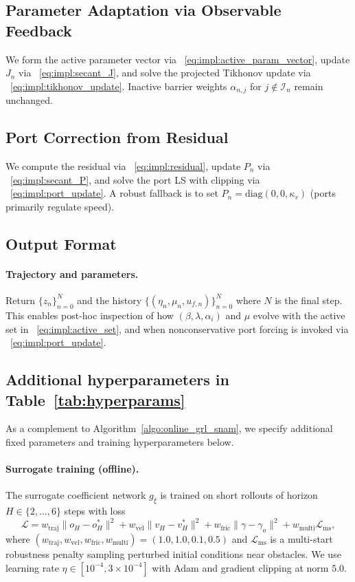 \subsection{Parameter Adaptation via Observable Feedback}
\label{subsec:parameter_adaptation}

We form the active parameter vector via ~\cref{eq:impl:active_param_vector}, update $J_n$ via ~\cref{eq:impl:secant_J},
and solve the projected Tikhonov update via ~\cref{eq:impl:tikhonov_update}. Inactive barrier weights $\alpha_{n,j}$ for
$j\notin\mathcal{I}_n$ remain unchanged.

\subsection{Port Correction from Residual}
\label{subsec:port_correction}

We compute the residual via ~\cref{eq:impl:residual}, update $P_n$ via ~\cref{eq:impl:secant_P}, and solve the port LS with
clipping via ~\cref{eq:impl:port_update}. A robust fallback is to set $P_n=\mathrm{diag}(0,0,\kappa_v)$ (ports primarily regulate speed).

\subsection{Output Format}
\label{subsec:output_format}

\paragraph{Trajectory and parameters.}
Return $\{z_n\}_{n=0}^{N}$ and the history $\{(\eta_n,\mu_n,u_{f,n})\}_{n=0}^{N}$ where $N$ is the final step. This enables post-hoc
inspection of how $(\beta,\lambda,\alpha_i)$ and $\mu$ evolve with the active set in ~\cref{eq:impl:active_set}, and when nonconservative
port forcing is invoked via ~\cref{eq:impl:port_update}.

\subsection{Additional hyperparameters in Table~\ref{tab:hyperparams}}
\label{subsec:hyperparam}

As a complement to Algorithm~\ref{algo:online_grl_snam}, we specify additional fixed parameters and training hyperparameters below.

\paragraph{Surrogate training (offline).}
The surrogate coefficient network $g_\xi$ is trained on short rollouts of horizon $H \in \{2,\ldots,6\}$ steps with loss
\[
\mathcal{L} = w_{\mathrm{traj}}\|o_H - o_H^*\|^2 + w_{\mathrm{vel}}\|v_H - v_H^*\|^2 + w_{\mathrm{fric}}\|\gamma - \gamma_o\|^2 + w_{\mathrm{multi}}\mathcal{L}_{\mathrm{ms}},
\]
where $(w_{\mathrm{traj}}, w_{\mathrm{vel}}, w_{\mathrm{fric}}, w_{\mathrm{multi}}) = (1.0, 1.0, 0.1, 0.5)$ and $\mathcal{L}_{\mathrm{ms}}$ is a multi-start robustness penalty sampling perturbed initial conditions near obstacles. We use learning rate $\eta \in [10^{-4}, 3 \times 10^{-4}]$ with Adam and gradient clipping at norm $5.0$.

